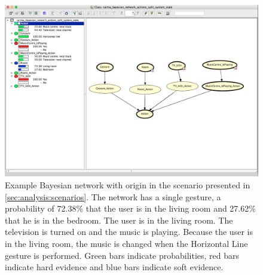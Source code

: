 \begin{figure}[h!]
\centering
\includegraphics[width=\textwidth]{images/bayesian-split-system-state-1}
\caption{Example Bayesian network with origin in the scenario presented in \cref{sec:analysis:scenarios}. The network has a single gesture, a probability of 72.38\% that the user is in the living room and 27.62\% that he is in the bedroom. The user is in the living room. The television is turned on and the music is playing. Because the user is in the living room, the music is changed when the Horizontal Line gesture is performed. Green bars indicate probabilities, red bars indicate hard evidence and blue bars indicate soft evidence.}
\label{fig:design:bayesian-network:evidence-system-state-nodes:system-state-1}
\end{figure}

